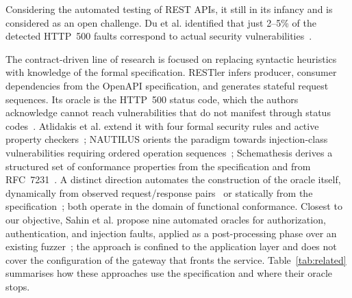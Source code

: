 Considering the automated testing of REST APIs, it still in its infancy and is considered as an open challenge. Du et al. identified that just 2--5\% of the detected HTTP~500 faults correspond to actual security vulnerabilities~\cite{duVulnerabilityorientedTestingRESTful2024}.

The contract-driven line of research is focused on replacing syntactic heuristics with knowledge of the formal specification.
RESTler infers producer, consumer dependencies from the OpenAPI specification, and generates stateful request sequences. Its oracle is the HTTP~500 status code, which the authors acknowledge cannot reach vulnerabilities that do not manifest through status codes~\cite{atlidakisRESTlerStatefulREST2019a}.
Atlidakis et al. extend it with four formal security rules and active property checkers~\cite{atlidakisCheckingSecurityProperties2020}; NAUTILUS orients the paradigm towards injection-class vulnerabilities requiring ordered operation sequences~\cite{dengNAUTILUSAutomatedRESTful2023}; Schemathesis derives a structured set of conformance properties from the specification and from RFC~7231~\cite{schemathesisDerivingSemanticsawareFuzzers2022}.
A distinct direction automates the construction of the oracle itself, dynamically from observed request/response pairs~\cite{alonsoAGORAAutomatedGeneration2023, alonsoAgora+TestOracleGeneration2025} or statically from the specification~\cite{alonsoSATORIStaticTest2025}; both operate in the domain of functional conformance.
Closest to our objective, Sahin et al. propose nine automated oracles for authorization, authentication, and injection faults, applied as a post-processing phase over an existing fuzzer~\cite{sahinEnhancingRESTAPI2026}; the approach is confined to the application layer and does not cover the configuration of the gateway that fronts the service.
Table~\ref{tab:related} summarises how these approaches use the specification and where their oracle stops.

